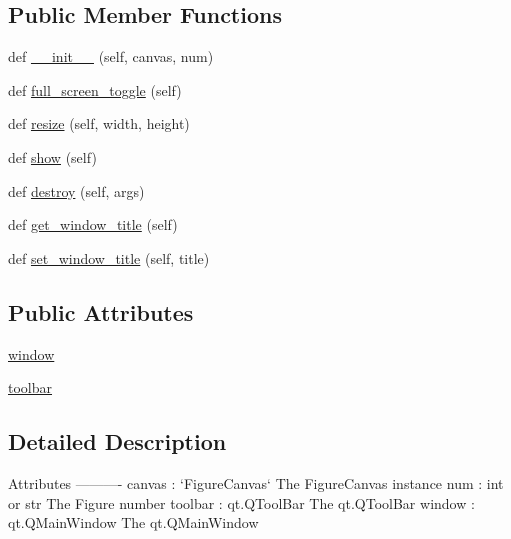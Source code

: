 \subsection*{Public Member Functions}
\begin{DoxyCompactItemize}
\item 
def \hyperlink{classmatplotlib_1_1backends_1_1backend__qt5_1_1FigureManagerQT_a19350f325c5c63e5b9ca3ea92b6930bd}{\+\_\+\+\_\+init\+\_\+\+\_\+} (self, canvas, num)
\item 
def \hyperlink{classmatplotlib_1_1backends_1_1backend__qt5_1_1FigureManagerQT_a006abe79d520f83b81074e28bea6b252}{full\+\_\+screen\+\_\+toggle} (self)
\item 
def \hyperlink{classmatplotlib_1_1backends_1_1backend__qt5_1_1FigureManagerQT_a52c52dced1a50866d7d58db1f6a5fe56}{resize} (self, width, height)
\item 
def \hyperlink{classmatplotlib_1_1backends_1_1backend__qt5_1_1FigureManagerQT_a89c35cfc1f99ca316879e5a1f8931008}{show} (self)
\item 
def \hyperlink{classmatplotlib_1_1backends_1_1backend__qt5_1_1FigureManagerQT_a065a9d4520d88150727206e68567bccd}{destroy} (self, args)
\item 
def \hyperlink{classmatplotlib_1_1backends_1_1backend__qt5_1_1FigureManagerQT_a6337503ca6ce3e0cd9c6a3eecaa78991}{get\+\_\+window\+\_\+title} (self)
\item 
def \hyperlink{classmatplotlib_1_1backends_1_1backend__qt5_1_1FigureManagerQT_a50452c46c2949edf5ab05797ac8057a1}{set\+\_\+window\+\_\+title} (self, title)
\end{DoxyCompactItemize}
\subsection*{Public Attributes}
\begin{DoxyCompactItemize}
\item 
\hyperlink{classmatplotlib_1_1backends_1_1backend__qt5_1_1FigureManagerQT_a6632ae9fd568077efbf3af4ab0e9fd46}{window}
\item 
\hyperlink{classmatplotlib_1_1backends_1_1backend__qt5_1_1FigureManagerQT_ae583771f5ff2764fcd5ce3dd1fcc3b22}{toolbar}
\end{DoxyCompactItemize}


\subsection{Detailed Description}
\begin{DoxyVerb}Attributes
----------
canvas : `FigureCanvas`
    The FigureCanvas instance
num : int or str
    The Figure number
toolbar : qt.QToolBar
    The qt.QToolBar
window : qt.QMainWindow
    The qt.QMainWindow
\end{DoxyVerb}
 

